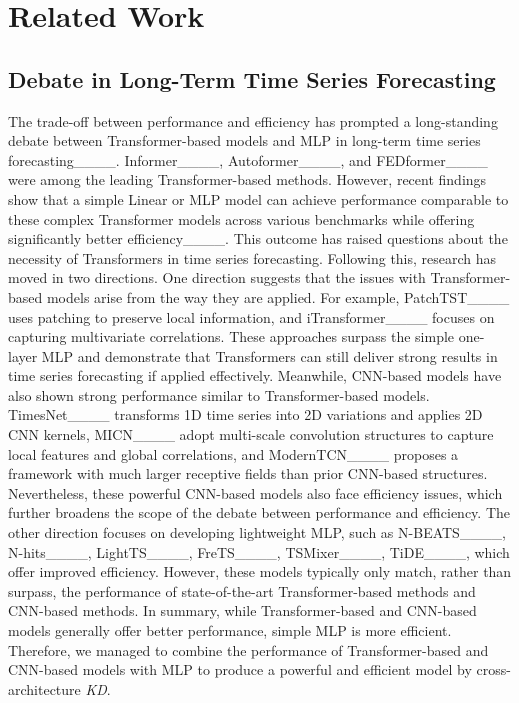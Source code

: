 \section{Related Work}
\label{app:related_work}
\subsection{Debate in Long-Term Time Series Forecasting}
The trade-off between performance and efficiency has prompted a long-standing debate between Transformer-based models and MLP in long-term time series forecasting____. Informer____, Autoformer____, and FEDformer____ were among the leading Transformer-based methods. However, recent findings show that a simple Linear or MLP model can achieve performance comparable to these complex Transformer models across various benchmarks while offering significantly better efficiency____. This outcome has raised questions about the necessity of Transformers in time series forecasting. Following this, research has moved in two directions. One direction suggests that the issues with Transformer-based models arise from the way they are applied.  For example, PatchTST____ uses patching to preserve local information, and iTransformer____ focuses on capturing multivariate correlations. These approaches surpass the simple one-layer MLP and demonstrate that Transformers can still deliver strong results in time series forecasting if applied effectively. Meanwhile, CNN-based models have also shown strong performance similar to Transformer-based models. TimesNet____ transforms 1D time series into 2D variations and applies 2D CNN kernels, MICN____ adopt multi-scale convolution structures to capture local features and global correlations, and ModernTCN____ proposes a framework with much larger receptive fields than prior CNN-based structures. Nevertheless, these powerful CNN-based models also face efficiency issues, which further broadens the scope of the debate between performance and efficiency. The other direction focuses on developing lightweight MLP, such as N-BEATS____, N-hits____, LightTS____, FreTS____, TSMixer____, TiDE____, which offer improved efficiency. However, these models typically only match, rather than surpass, the performance of state-of-the-art Transformer-based methods and CNN-based methods. In summary, while Transformer-based and CNN-based models generally offer better performance, simple MLP is more efficient. Therefore, we managed to combine the performance of Transformer-based and CNN-based models with MLP to produce a powerful and efficient model by cross-architecture \textit{KD}.

